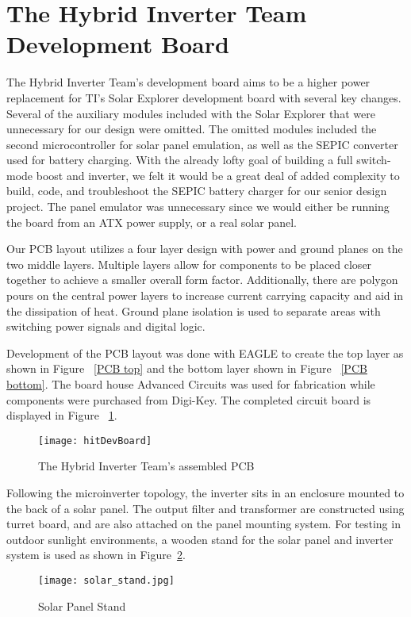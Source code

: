 \section{The Hybrid Inverter Team Development Board}
The Hybrid Inverter Team's development board aims to be a higher power replacement for TI's Solar Explorer development board with several key changes. Several of the auxiliary modules included with the Solar Explorer that were unnecessary for our design were omitted. The omitted modules included the second microcontroller for solar panel emulation, as well as the SEPIC converter used for battery charging. With the already lofty goal of building a full switch-mode boost and inverter, we felt it would be a great deal of added complexity to build, code, and troubleshoot the SEPIC battery charger for our senior design project. The panel emulator was unnecessary since we would either be running the board from an ATX power supply, or a real solar panel.

Our PCB layout utilizes a four layer design with power and ground planes on the two middle layers. Multiple layers allow for components to be placed closer together to achieve a smaller overall form factor. Additionally, there are polygon pours on the central power layers to increase current carrying capacity and aid in the dissipation of heat. Ground plane isolation is used to separate areas with switching power signals and digital logic.

Development of the PCB layout was done with EAGLE to create the top layer as shown in Figure ~\ref{PCB top} and the bottom layer shown in Figure ~\ref{PCB bottom}. The board house Advanced Circuits was used for fabrication while components were purchased from Digi-Key. The completed circuit board is displayed in Figure ~\ref{hybrid_PCB}. 
 

\begin{figure}
\centering
\texttt{[image: hitDevBoard]}
\caption{The Hybrid Inverter Team's assembled PCB}
\label{hybrid_PCB}
\end{figure}


Following the microinverter topology, the inverter sits in an enclosure mounted to the back of a solar panel. The output filter and transformer are constructed using turret board, and are also attached on the panel mounting system. For testing in outdoor sunlight environments, a wooden stand for the solar panel and inverter system is used as shown in Figure~\ref{solar stand}.

\begin{figure}
\centering
\texttt{[image: solar\_stand.jpg]}
\caption{Solar Panel Stand}
\label{solar stand}
\end{figure}

